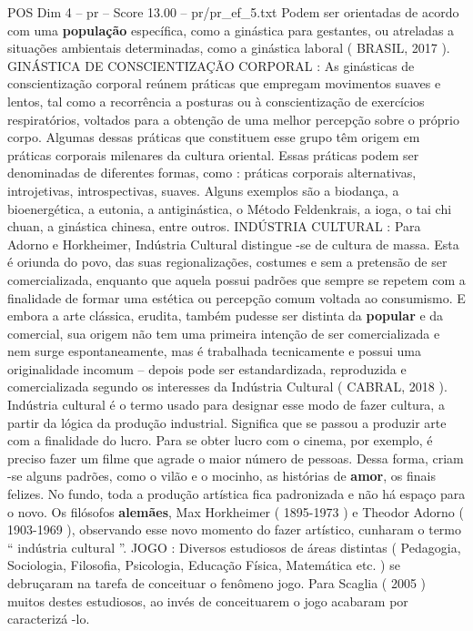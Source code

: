 \begin{textsample}{POS Dim 4 – pr – Score 13.00 – pr/pr\_ef\_5.txt}
Podem ser orientadas de acordo com uma \textbf{população} específica, como a ginástica para gestantes, ou atreladas a situações ambientais determinadas, como a ginástica laboral ( BRASIL, 2017 ).
GINÁSTICA DE CONSCIENTIZAÇÃO CORPORAL : As ginásticas de conscientização corporal reúnem práticas que empregam movimentos suaves e lentos, tal como a recorrência a posturas ou à conscientização de exercícios respiratórios, voltados para a obtenção de uma melhor percepção sobre o próprio corpo.
Algumas dessas práticas que constituem esse grupo têm origem em práticas corporais milenares da cultura oriental.
Essas práticas podem ser denominadas de diferentes formas, como : práticas corporais alternativas, introjetivas, introspectivas, suaves.
Alguns exemplos são a biodança, a bioenergética, a eutonia, a antiginástica, o Método Feldenkrais, a ioga, o tai chi chuan, a ginástica chinesa, entre outros.
INDÚSTRIA CULTURAL : Para Adorno e Horkheimer, Indústria Cultural distingue -se de cultura de massa.
Esta é oriunda do povo, das suas regionalizações, costumes e sem a pretensão de ser comercializada, enquanto que aquela possui padrões que sempre se repetem com a finalidade de formar uma estética ou percepção comum voltada ao consumismo.
E embora a arte clássica, erudita, também pudesse ser distinta da \textbf{popular} e da comercial, sua origem não tem uma primeira intenção de ser comercializada e nem surge espontaneamente, mas é trabalhada tecnicamente e possui uma originalidade incomum – depois pode ser estandardizada, reproduzida e comercializada segundo os interesses da Indústria Cultural ( CABRAL, 2018 ).
Indústria cultural é o termo usado para designar esse modo de fazer cultura, a partir da lógica da produção industrial.
Significa que se passou a produzir arte com a finalidade do lucro.
Para se obter lucro com o cinema, por exemplo, é preciso fazer um filme que agrade o maior número de pessoas.
Dessa forma, criam -se alguns padrões, como o vilão e o mocinho, as histórias de \textbf{amor}, os finais felizes.
No fundo, toda a produção artística fica padronizada e não há espaço para o novo.
Os filósofos \textbf{alemães}, Max Horkheimer ( 1895-1973 ) e Theodor Adorno ( 1903-1969 ), observando esse novo momento do fazer artístico, cunharam o termo “ indústria cultural ”.
JOGO : Diversos estudiosos de áreas distintas ( Pedagogia, Sociologia, Filosofia, Psicologia, Educação Física, Matemática etc. ) se debruçaram na tarefa de conceituar o fenômeno jogo.
Para Scaglia ( 2005 ) muitos destes estudiosos, ao invés de conceituarem o jogo acabaram por caracterizá -lo.

\end{textsample}
